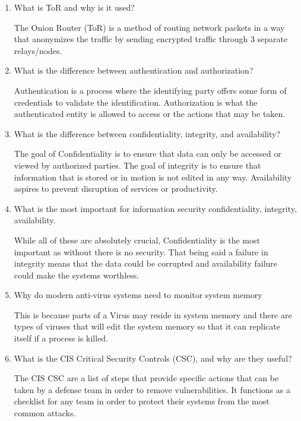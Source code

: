 \documentclass{exam}
\begin{document}
\begin{enumerate}
	\item What is ToR and why is it used?
	\begin{solution}
		The Onion Router (ToR) is a method of routing network packets in a way that anonymizes the traffic by sending encrypted traffic through 3 separate relays/nodes.  
	\end{solution}
	\item What is the difference between authentication and authorization?
	\begin{solution}
		Authentication is a process where the identifying party offers some form of credentials to validate the identification. Authorization is what the authenticated entity is allowed to access or the actions that may be taken. 
	\end{solution}
	\item What is the difference between confidentiality, integrity, and availability?
	\begin{solution}
		The goal of Confidentiality is to ensure that data can only be accessed or viewed by authorized parties. The goal of integrity is to ensure that information that is stored or in motion is not edited in any way. Availability aspires to prevent disruption of services or productivity. 
	\end{solution}
	\item What is the most important for information security confidentiality, integrity, availability. 
	\begin{solution}
		While all of these are absolutely crucial, Confidentiality is the most important as without there is no security. That being said a failure in integrity means that the data could be corrupted and availability failure could make the systems worthless. 
	\end{solution}
	\item Why do modern anti-virus systems need to monitor system memory
	\begin{solution}
		This is because parts of a Virus may reside in system memory and there are types of viruses that will edit the system memory so that it can replicate itself if a process is killed. 
	\end{solution}
	\item What is the CIS Critical Security Controls (CSC), and why are they useful?
	\begin{solution}
		The CIS CSC are a list of steps that provide specific actions that can be taken by a defense team in order to remove vulnerabilities. It functions as a checklist for any team in order to protect their systems from the most common attacks. 
		

\end{solution}
\end{enumerate}
\end{document}
